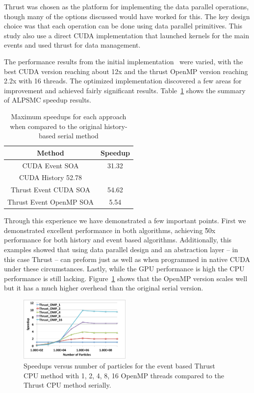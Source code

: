 Thrust was chosen as the platform for implementing the data parallel operations, though many of the options discussed would have worked for this.
%
The key design choice was that each operation can be done using data parallel primitives.
%
 This study also use a direct CUDA implementation that launched kernels for the main events and used thrust for data management.


The performance results from the initial implementation~\cite{} were varied, with the best CUDA version reaching about 12x and the thrust OpenMP version reaching 2.2x with 16 threads.
%
The optimized implementation discovered a few areas for improvement and achieved fairly significant results.
%
Table~\ref{tab:ALPSspeedup} shows the summary of ALPSMC speedup results.
%

\begin{table}
\caption { Maximum speedups for each approach when compared to the original history-based serial method } \label{tab:ALPSspeedup} 
\begin{center}
\begin{tabular}{ |c|c|}
\hline
Method & Speedup\\
\hline
CUDA Event SOA & 31.32\\
\hline
CUDA History 52.78\\
\hline
Thrust Event CUDA SOA & 54.62\\
\hline
Thrust Event OpenMP SOA & 5.54\\
\hline
\end{tabular}
\end{center}
\end{table}

Through this experience we have demonstrated a few important points.
%
First we demonstrated excellent performance in both algorithms, achieving \~50x performance for both history and event based algorithms.
%
Additionally, this examples showed that using data parallel design and an abstraction layer -- in this case Thrust -- can preform just as well as when programmed in native CUDA under these circumstances. 
%
Lastly, while the GPU performance is high the CPU performance is still lacking.
%
Figure~\ref{fig:OMPScale} shows that the OpenMP version scales well but it has a much higher overhead than the original serial version.

\begin{figure}
\label{fig:OMPScale}
\includegraphics[width=0.49\textwidth]{thrustOMPSpeedup.pdf}
\caption{Speedups versus number of particles for the event based Thrust CPU method with 1, 2, 4, 8, 16 OpenMP threads compared to the Thrust CPU method serially.~\cite{}}
\end{figure}

